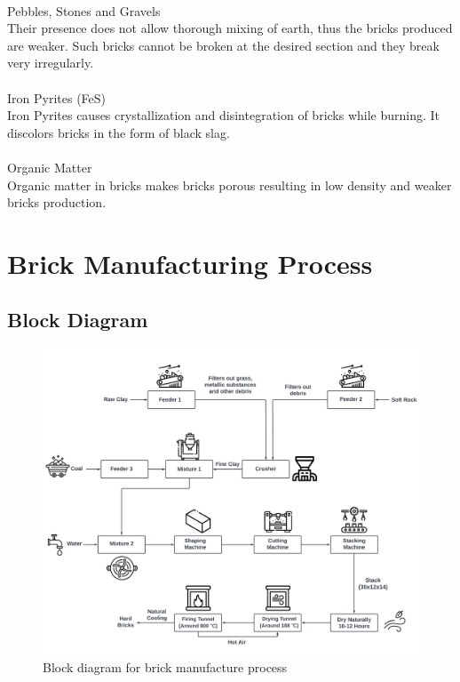 \documentclass{article}
\begin{document}
\vspace{0.1cm}\\
Pebbles, Stones and Gravels\\
Their presence does not allow thorough mixing of earth, thus the bricks produced are weaker. Such bricks cannot be broken at the desired section and they break very irregularly.\\
\vspace{0.1cm}\\
Iron Pyrites (FeS)\\
Iron Pyrites causes crystallization and disintegration of bricks while burning. It discolors bricks in the form of black slag.\\
\vspace{0.1cm}\\
Organic Matter\\
Organic matter in bricks makes bricks porous resulting in low density and weaker bricks production.\\

\newpage
\section{Brick Manufacturing Process}

\subsection{Block Diagram}
\begin{figure}[h]
  \centering
  \includegraphics[width=1\textwidth]{img/block diagram.png}
  \caption{Block diagram for brick manufacture process}
\end{figure}
\end{document}
